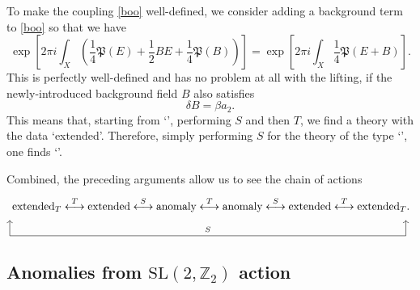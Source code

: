 \documentclass[12pt]{article}
\numberwithin{equation}{section}
\def\bZ{\mathbb{Z}}
\def\fP{\mathfrak{P}}
\def\SL{\mathrm{SL}}
\begin{document}
To make  the coupling \eqref{boo}  well-defined, we consider adding a background term to \eqref{boo} so that we have \begin{equation}
\exp\left[2\pi i\int_X \left( \frac14 \fP(E) +\frac12 B E + \frac14 \fP(B) \right)\right]
= 
\exp \left[2\pi i \int_X \frac14 \fP(E+B)\right] .
\end{equation}
This is perfectly well-defined and has no problem at all with the lifting,
if the newly-introduced background field $B$  also satisfies \begin{equation}
\delta B=\beta a_2.
\end{equation}
This means that, starting from `\Textended', performing $S$ and then $T$, we find a theory with the data `extended'.
Therefore, simply performing $S$ for the theory of the type `\Textended',  one  finds `\Textended'.

Combined, the preceding arguments allow us to see the chain of actions \begin{equation}
\begin{tikzpicture}
	\node at (0,0) {$
		\text{\Textended} \stackrel{T}{\longleftrightarrow} 
		\text{extended} \stackrel{S}{\longleftrightarrow} 
		\text{anomaly} \stackrel{T}{\longleftrightarrow} 
		\text{anomaly} \stackrel{S}{\longleftrightarrow} 
		\text{extended}\stackrel{T}{\longleftrightarrow} 
		\text{\Textended}.
	$};
	\draw[->] (-6.5,-1) -- (-6.5,-0.5);
	\draw[->] (6.3,-1) -- (6.3,-0.5);
	\draw (-6.5,-1) -- node[above] {\scriptsize $S$} (6.3,-1);
\end{tikzpicture}
\label{nontrivial-chain}
\end{equation}


\subsection{Anomalies from $\SL(2,\bZ_2)$ action} 
\end{document}
